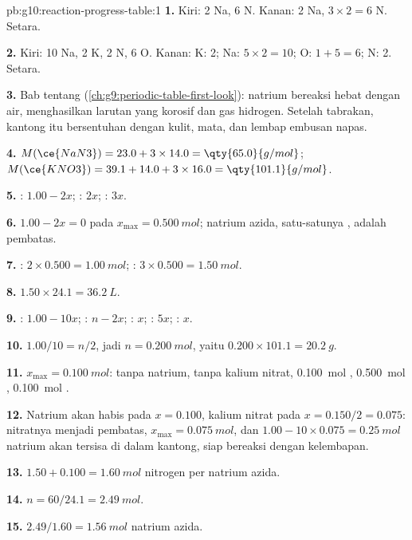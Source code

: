 \begin{solution}{pb:g10:reaction-progress-table:1}
\textbf{1.} Kiri: 2 Na, 6 N. Kanan: 2 Na, $3 \times 2 = 6$ N. Setara.

\textbf{2.} Kiri: 10 Na, 2 K, 2 N, 6 O. Kanan: K: 2; Na: $5 \times 2 =
10$; O: $1 + 5 = 6$; N: 2. Setara.

\textbf{3.} Bab tentang  (\cref{ch:g9:periodic-table-first-look}):
natrium bereaksi hebat dengan air, menghasilkan larutan yang korosif dan
gas hidrogen. Setelah tabrakan, kantong itu bersentuhan dengan kulit,
mata, dan  lembap embusan napas.

\textbf{4.} $M(\ce{NaN3}) = 23.0 + 3 \times 14.0 = \qty{65.0}{g/mol}$;
$M(\ce{KNO3}) = 39.1 + 14.0 + 3 \times 16.0 = \qty{101.1}{g/mol}$.

\textbf{5.} : $1.00 - 2x$; : $2x$; : $3x$.

\textbf{6.} $1.00 - 2x = 0$ pada $x_{\max} = \qty{0.500}{mol}$; natrium
azida, satu-satunya , adalah pembatas.

\textbf{7.} : $2 \times 0.500 = \qty{1.00}{mol}$; :
$3 \times 0.500 = \qty{1.50}{mol}$.

\textbf{8.} $1.50 \times 24.1 = \qty{36.2}{L}$.

\textbf{9.} : $1.00 - 10x$; : $n - 2x$; : $x$;
: $5x$; : $x$.

\textbf{10.} $1.00/10 = n/2$, jadi $n = \qty{0.200}{mol}$, yaitu
$0.200 \times 101.1 = \qty{20.2}{g}$.

\textbf{11.} $x_{\max} = \qty{0.100}{mol}$: tanpa natrium, tanpa kalium
nitrat, \qty{0.100}{mol} , \qty{0.500}{mol} ,
\qty{0.100}{mol} .

\textbf{12.} Natrium akan habis pada $x = 0.100$, kalium nitrat pada
$x = 0.150/2 = 0.075$: nitratnya menjadi pembatas, $x_{\max} =
\qty{0.075}{mol}$, dan $1.00 - 10 \times 0.075 = \qty{0.25}{mol}$ 
natrium akan tersisa di dalam kantong, siap bereaksi dengan kelembapan.

\textbf{13.} $1.50 + 0.100 = \qty{1.60}{mol}$ nitrogen per  natrium
azida.

\textbf{14.} $n = 60 / 24.1 = \qty{2.49}{mol}$.

\textbf{15.} $2.49 / 1.60 = \qty{1.56}{mol}$ natrium azida.


\end{solution}
